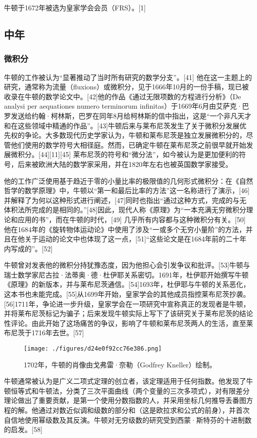 牛顿于1672年被选为皇家学会会员（FRS）。[1]
\subsection{中年}  
\subsubsection{微积分}  
牛顿的工作被认为“显著推动了当时所有研究的数学分支”。[41] 他在这一主题上的研究，通常称为流量（fluxions）或微积分，见于1666年10月的一份手稿，现已被收录在牛顿的数学论文中。[42]他的作品《通过无限项数的方程进行分析》（De analysi per aequationes numero terminorum infinitas）于1669年6月由艾萨克·巴罗发送给约翰·柯林斯，巴罗在同年8月给柯林斯的信中指出，这是“一个非凡天才和在这些领域中精通的作品”。[43]牛顿后来与莱布尼茨发生了关于微积分发展优先权的争论。大多数现代历史学家认为，牛顿和莱布尼茨是独立发展微积分的，尽管他们使用的数学符号大相径庭。然而，已确定牛顿在莱布尼茨之前很早就开始发展微积分。[44][11][45] 莱布尼茨的符号和“微分法”，如今被认为是更加便利的符号，后来被欧洲大陆的数学家采用，并在1820年左右也被英国数学家接受。

他的工作广泛使用基于趋近于零的小量比率的极限值的几何形式微积分：在《自然哲学的数学原理》中，牛顿以“第一和最后比率的方法”这一名称进行了演示，[46] 并解释了为何以这种形式进行阐述，[47]同时也指出“通过这种方式，完成的与无体积法所完成的是相同的。”[48]因此，现代人称《原理》为“一本充满无穷微积分理论和应用的书”，而在牛顿的时代，[49] 几乎所有内容都与这种微积分有关。[50] 他在1684年的《旋转物体运动论》中使用了涉及“一或多个无穷小量阶”的方法，并且在他关于运动的论文中也体现了这一点，[51]“这些论文是在1684年前的二十年内写成的”。[52]

牛顿曾对发表他的微积分持犹豫态度，因为他担心会引发争议和批评。[53]牛顿与瑞士数学家尼古拉·法蒂奥·德·杜伊耶关系密切。1691年，杜伊耶开始撰写牛顿《原理》的新版本，并与莱布尼茨通信。[54]1693年，杜伊耶与牛顿的关系恶化，这本书也未能完成。[55]从1699年开始，皇家学会的其他成员指控莱布尼茨抄袭。[56]1711年，争论进一步升级，皇家学会在一项研究中宣称真正的发现者是牛顿，并将莱布尼茨标记为骗子；后来发现牛顿实际上写下了该研究关于莱布尼茨的结论性评论。由此开始了这场痛苦的争议，影响了牛顿和莱布尼茨两人的生活，直至莱布尼茨于1716年去世。[57]
\begin{figure}[ht]
\centering
\texttt{[image: ./figures/d24e0f92cc76e386.png]}
\caption{1702年，牛顿的肖像由戈弗雷·奈勒（Godfrey Kneller）绘制。} \label{fig_Newton_2}
\end{figure}
牛顿通常被认为是广义二项式定理的创立者，该定理适用于任何指数。他发现了牛顿恒等式和牛顿法，分类了三次平面曲线（两个变量的三次多项式），对有限差分理论做出了重要贡献，是第一个使用分数指数的人，并采用坐标几何推导丢番图方程的解。他通过对数近似调和级数的部分和（这是欧拉求和公式的前身），并首次自信地使用幂级数及其反演。牛顿对无穷级数的研究受到西蒙·斯特芬的十进制数的启发。[58]
